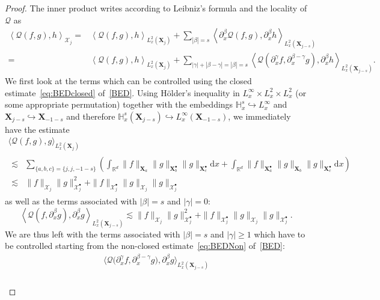 \documentclass[10pt]{amsart}
\theoremstyle{definition}\newtheorem{defi}[theo]{Definition}\newtheorem{rema}[theo]{Remark}\newtheorem{exam}[theo]{Example}\newtheorem{exem}[theo]{Example}\newtheorem{nota}[theo]{Notation}
\renewcommand{\d}{\mathrm{d}}
\newcommand{\R}{\mathbb{R}}
\newcommand{\bbH}{\mathbb{H}}
\newcommand{\XX}{\mathcal{X}}
\newcommand{\QQ}{\mathcal{Q}}
\newcommand{\Sh}{\bm{X}}
\newcommand{\Shp}{\bm{X}^{\bullet}}
\newcommand{\SSh}{\bm{\XX}}
\newcommand{\SShp}{\bm{\XX}^{\bullet}}
\renewcommand*\ge{\geqslant}
\newcommand{\la}{\langle}
\newcommand{\ra}{\rangle}
\begin{document}
\begin{proof}
The inner product writes according to Leibniz's formula and the locality of $\QQ$ as
\begin{align*}
\left\la \QQ(f, g), h \right\ra_{ \SSh_j } = & \left\la \QQ(f, g), h \right\ra_{ L^2_x \left(\Sh_{j} \right) } + \sum_{| \beta | = s } \left\la \partial_x^\beta \QQ(f, g), \partial_x^\beta h \right\ra_{ L^2_x \left(\Sh_{j-s} \right) } \\ = & \left\la \QQ(f, g), h \right\ra_{ L^2_x \left(\Sh_{j} \right) } + {\sum_{|\gamma|+|\beta-\gamma|=|\beta|=s}} \left\la \QQ\left(\partial_x^\gamma f, \partial_x^{\beta-\gamma} g \right), \partial_x^{\beta} h \right\ra_{ L^2_x \left(\Sh_{j-s} \right) }.
\end{align*}
We first look at the terms which can be controlled using the closed estimate~\eqref{eq:BEDclosed} of~\eqref{BED}. Using H\"older's inequality in $L^\infty_x \times L^2_x \times L^2_x$ (or some appropriate permutation) together with the embeddings $\bbH^s_x \hookrightarrow L^\infty_x$ and $\Sh_{j-s} \hookrightarrow \Sh_{-1-s}$ and therefore $\bbH^s_x (\Sh_{j-s}) \hookrightarrow L^\infty_x (\Sh_{-1-s})$, we immediately have the estimate
\begin{multline*}
\la \QQ(f, g), g \ra_{ L^2_x \left(\Sh_{j} \right) }
\\
\begin{aligned}
\lesssim & \sum_{ \{ a, b, c \} = \{j, j, -1-s \} } \left(\int_{\R^d} \| f \|_{\Sh_{ a }} \| g \|_{\Shp_{b}} \| g \|_{\Shp_{c}} \d x + \int_{\R^{d}}\| f \|_{\Shp_{a}} \| g \|_{\Sh_{b}} \| g \|_{\Shp_{c}} \d x \right)\\
\lesssim & \| f \|_{ \SSh_j } \| g \|_{ \SShp_j }^2 + \| f \|_{ \SShp_j } \| g \|_{ \SSh_j } \| g \|_{ \SShp_j }
\end{aligned}
\end{multline*}
as well as the terms associated with $| \beta | = s$ and $|\gamma| = 0$:
\[
\left\la \QQ\left(f, \partial_x^\beta g\right), \partial_x^\beta g \right\ra_{ L^2_x \left(\Sh_{j-s} \right) } \lesssim \| f \|_{ \SSh_j } \| g \|_{ \SShp_j }^2 + \| f \|_{ \SShp_j } \| g \|_{ \SSh_j } \| g \|_{ \SShp_j }.
\]
We are thus left with the terms associated with $|\beta|=s$ and $|\gamma| \ge 1$ which have to be controlled starting from the non-closed estimate~\eqref{eq:BEDNon} of~\ref{BED}:
\begin{multline}\label{eq:QQgammabeta}
\Big\la \QQ\big(\partial_x^\gamma f,  \partial_x^{\beta-\gamma} g\big), \partial_x^\beta g \Big\ra_{ L^2_x \left(\Sh_{j-s} \right) } \\
\begin{aligned}

\end{aligned}
\end{multline}
\end{proof}
\end{document}
